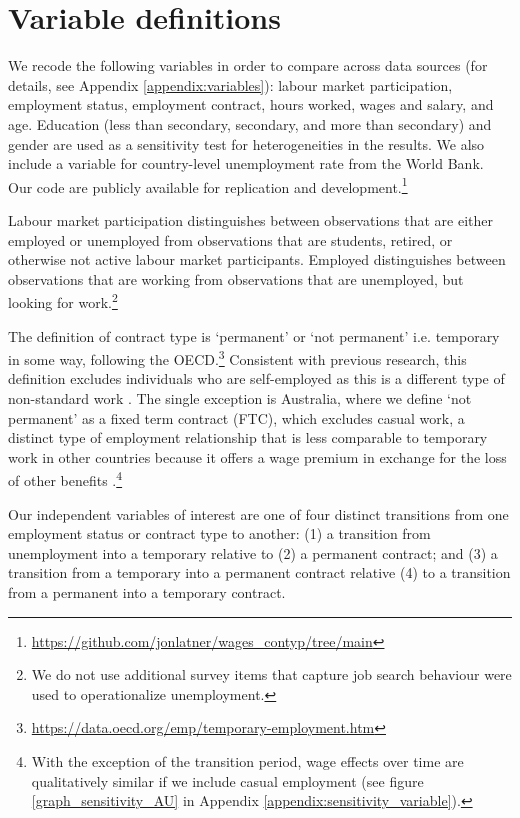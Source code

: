 \documentclass[12pt]{article}
\begin{document}
\section{Variable definitions}

We recode the following variables in order to compare across data sources (for details, see Appendix \ref{appendix:variables}): labour market participation, employment status, employment contract, hours worked, wages and salary, and age.  Education (less than secondary, secondary, and more than secondary) and gender are used as a sensitivity test for heterogeneities in the results.  We also include a variable for country-level unemployment rate from the World Bank.  Our code are publicly available for replication and development.\footnote{\url{https://github.com/jonlatner/wages_contyp/tree/main}} 

Labour market participation distinguishes between observations that are either employed or unemployed from observations that are students, retired, or otherwise not active labour market participants.  Employed distinguishes between observations that are working from observations that are unemployed, but looking for work.\footnote{We do not use additional survey items that capture job search behaviour were used to operationalize unemployment.}  

The definition of contract type is `permanent' or `not permanent' i.e. temporary in some way, following the OECD.\footnote{\url{https://data.oecd.org/emp/temporary-employment.htm}}  Consistent with previous research, this definition excludes individuals who are self-employed as this is a different type of non-standard work \citep{booth_temporary_2002,kalleberg_nonstandard_2000}.  The single exception is Australia, where we define `not permanent' as a fixed term contract (FTC), which excludes casual work, a distinct type of employment relationship that is less comparable to temporary work in other countries because it offers a wage premium in exchange for the loss of other benefits \citep{mooi-reci_casual_2017}.\footnote{With the exception of the transition period, wage effects over time are qualitatively similar if we include casual employment (see figure \ref{graph_sensitivity_AU} in Appendix \ref{appendix:sensitivity_variable}).} 

Our independent variables of interest are one of four distinct transitions from one employment status or contract type to another: (1) a transition from unemployment into a temporary relative to (2) a permanent contract; and (3) a transition from a temporary into a permanent contract relative (4) to a transition from a permanent into a temporary contract.  
\end{document}
